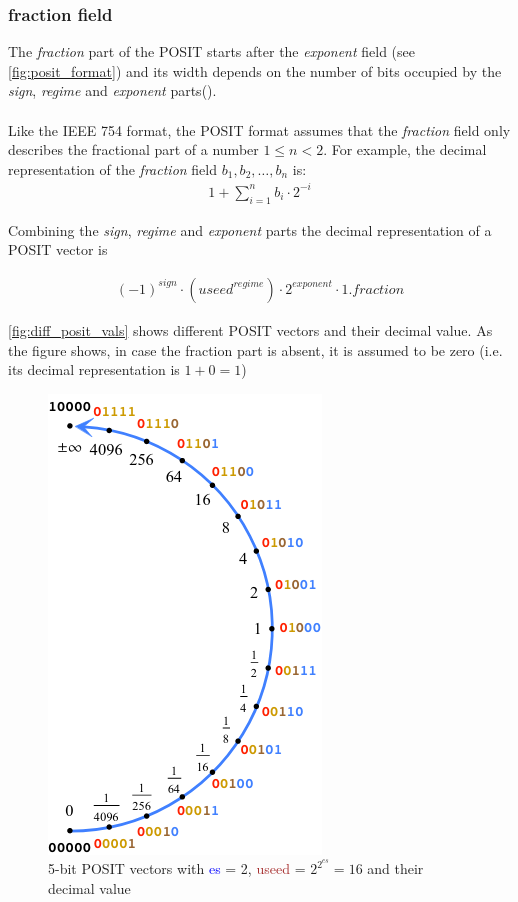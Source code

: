 \documentclass[10pt]{article}
\begin{document}
\subsubsection{fraction field}\label{sec:fraction-field}
The \textit{fraction} part of the POSIT starts after the \textit{exponent} field
(see \autoref{fig:posit_format}) and its width depends on the number of bits
occupied by the \textit{sign}, \textit{regime} and \textit{exponent}
parts().

\paragraph{}
Like the IEEE 754 format, the POSIT format assumes that the \textit{fraction} field only
describes the fractional part of a number $1\leq n < 2 $. For example, the
decimal representation of the \textit{fraction} field $b_{1},b_{2},\dots,b_{n}$
is:
\begin{align*}
 1 + \sum_{i=1}^{n}b_{i}\cdot 2^{-i}
\end{align*}

Combining the \textit{sign}, \textit{regime} and \textit{exponent} parts the
decimal representation of a POSIT vector is

\begin{align}
  \label{eq:3}
  {(-1)}^{sign} \cdot ({useed}^{regime}) \cdot {2}^{exponent} \cdot 1.fraction
\end{align}


\autoref{fig:diff_posit_vals} shows different POSIT vectors and their decimal
value. As the figure shows, in case the fraction part is absent, it is assumed
to be zero (i.e. its decimal representation is $1 + 0 = 1$)

\begin{figure}[h]
  \centering
  \includegraphics[height=0.25\paperheight]{posit_values}
  \caption{5-bit POSIT vectors with \textcolor{blue}{es} = 2, \textcolor{brown}{useed} = $2^{2^{es}} = 16$ and their
    decimal value}
  \label{fig:diff_posit_vals}
\end{figure}
\end{document}
